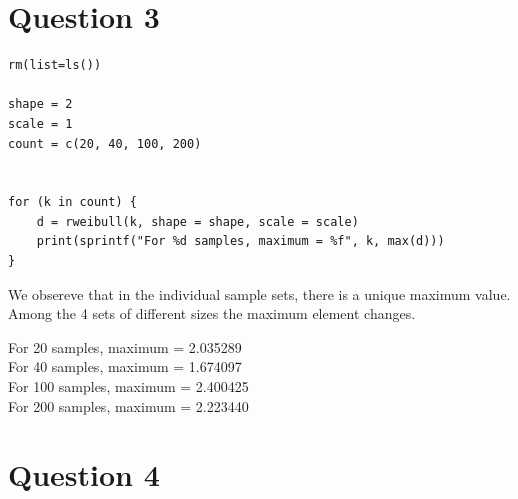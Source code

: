 \documentclass{article}
\begin{document}
\section{Question 3}


\begin{lstlisting}
rm(list=ls())

shape = 2
scale = 1
count = c(20, 40, 100, 200)


for (k in count) {
	d = rweibull(k, shape = shape, scale = scale)
	print(sprintf("For %d samples, maximum = %f", k, max(d)))
}
\end{lstlisting}

We obsereve that in the individual sample sets, there is a unique maximum value. Among the 4 sets of different sizes the maximum element changes.

For 20 samples, maximum = 2.035289\\
For 40 samples, maximum = 1.674097\\
For 100 samples, maximum = 2.400425\\
For 200 samples, maximum = 2.223440

\section{Question 4}

\end{document}
